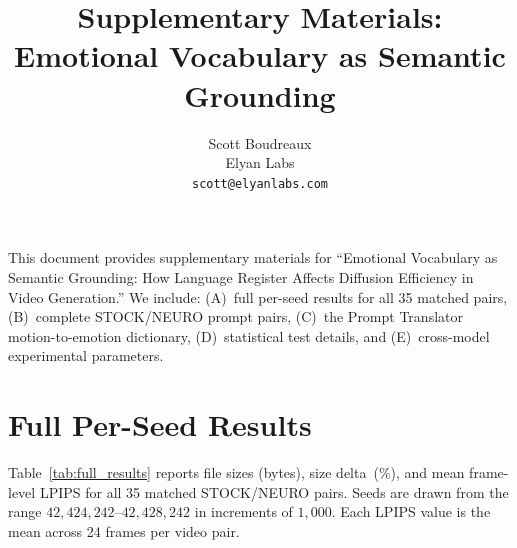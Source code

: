 \documentclass[10pt,twocolumn,letterpaper]{article}
\begin{document}
\title{Supplementary Materials: Emotional Vocabulary as Semantic Grounding}

\author{Scott Boudreaux\\
Elyan Labs\\
{\tt\small scott@elyanlabs.com}
}

\maketitle

This document provides supplementary materials for ``Emotional Vocabulary as Semantic Grounding: How Language Register Affects Diffusion Efficiency in Video Generation.'' We include: (A)~full per-seed results for all 35 matched pairs, (B)~complete STOCK/NEURO prompt pairs, (C)~the Prompt Translator motion-to-emotion dictionary, (D)~statistical test details, and (E)~cross-model experimental parameters.

\section{Full Per-Seed Results}
\label{sec:perseed}

Table~\ref{tab:full_results} reports file sizes (bytes), size delta~(\%), and mean frame-level LPIPS for all 35 matched STOCK/NEURO pairs. Seeds are drawn from the range $42{,}424{,}242$--$42{,}428{,}242$ in increments of $1{,}000$. Each LPIPS value is the mean across 24 frames per video pair.
\end{document}
